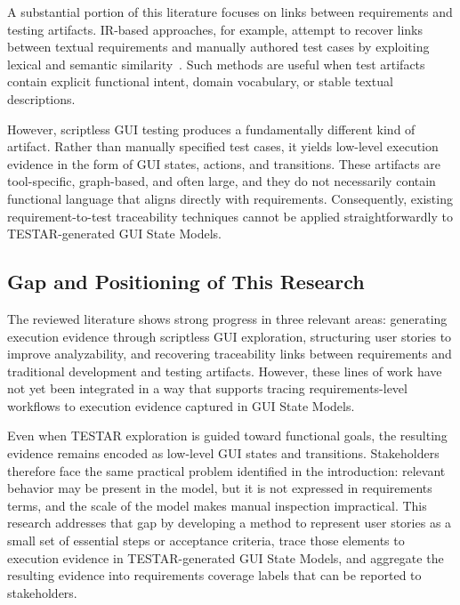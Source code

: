 A substantial portion of this literature focuses on links between requirements and testing artifacts. IR-based approaches, for example, attempt to recover links between textual requirements and manually authored test cases by exploiting lexical and semantic similarity~\citep{hayes2003improving,oliveto2010equivalence}. Such methods are useful when test artifacts contain explicit functional intent, domain vocabulary, or stable textual descriptions.

However, scriptless GUI testing produces a fundamentally different kind of artifact. Rather than manually specified test cases, it yields low-level execution evidence in the form of GUI states, actions, and transitions. These artifacts are tool-specific, graph-based, and often large, and they do not necessarily contain functional language that aligns directly with requirements. Consequently, existing requirement-to-test traceability techniques cannot be applied straightforwardly to TESTAR-generated GUI State Models.

\subsection{Gap and Positioning of This Research}
\label{subsec:positioning}

The reviewed literature shows strong progress in three relevant areas: generating execution evidence through scriptless GUI exploration, structuring user stories to improve analyzability, and recovering traceability links between requirements and traditional development and testing artifacts. However, these lines of work have not yet been integrated in a way that supports tracing requirements-level workflows to execution evidence captured in GUI State Models.

Even when TESTAR exploration is guided toward functional goals, the resulting evidence remains encoded as low-level GUI states and transitions. Stakeholders therefore face the same practical problem identified in the introduction: relevant behavior may be present in the model, but it is not expressed in requirements terms, and the scale of the model makes manual inspection impractical. This research addresses that gap by developing a method to represent user stories as a small set of essential steps or acceptance criteria, trace those elements to execution evidence in TESTAR-generated GUI State Models, and aggregate the resulting evidence into requirements coverage labels that can be reported to stakeholders.
